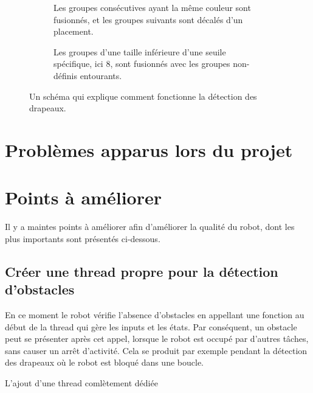 \documentclass{article}
\begin{document}
\begin{figure}[!ht]
\begin{subfigure}{\textwidth}
            \caption{Les groupes consécutives ayant la même couleur sont fusionnés, et les groupes suivants sont décalés d'un placement.}
        \end{subfigure}

        \vspace{5mm}

        \begin{subfigure}{\textwidth}
            \begin{center}
            \end{center}

            \caption{Les groupes d'une taille inférieure d'une seuile spécifique, ici 8, sont fusionnés avec les groupes non-définis entourants.}
        \end{subfigure}
        \caption{Un schéma qui explique comment fonctionne la détection des drapeaux.}
    \end{figure}

    \section{Problèmes apparus lors du projet}


    \section{Points à améliorer}
    Il y a maintes points à améliorer afin d'améliorer la qualité du robot, dont les plus importants sont présentés ci-dessous.

    \subsection{Créer une thread propre pour la détection d'obstacles}
    En ce moment le robot vérifie l'absence d'obstacles en appellant une fonction au début de la thread qui gère les inputs et les états.
    Par conséquent, un obstacle peut se présenter après cet appel, lorsque le robot est occupé par d'autres tâches, sans causer un arrêt d'activité.
    Cela se produit par exemple pendant la détection des drapeaux où le robot est bloqué dans une boucle.

    L'ajout d'une thread comlètement dédiée
\end{document}
